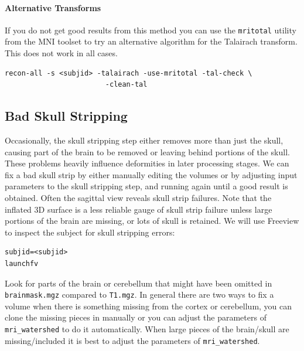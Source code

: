 \documentclass[paper=a4, fontsize=11pt]{scrartcl} %
\numberwithin{equation}{section} %
\numberwithin{figure}{section} %
\numberwithin{table}{section} %
\begin{document}
\paragraph{Alternative Transforms} If you do not get good results from this method you can use the \texttt{mritotal} utility from the MNI toolset to try an alternative algorithm for the Talairach transform.  This does not work in all cases.
~\\
\begin{lstlisting}[frame= single]
recon-all -s <subjid> -talairach -use-mritotal -tal-check \
						-clean-tal
\end{lstlisting}

\subsection{Bad Skull Stripping}\label{ss:ss} Occasionally, the skull stripping step either removes more than just the skull, causing part of the brain to be removed or leaving behind portions of the skull. These problems heavily influence deformities in later processing stages.  We can fix a bad skull strip by either  manually editing the volumes or by adjusting input parameters to the skull stripping step, and running again until a good result is obtained. Often the sagittal view reveals skull strip failures. Note that the inflated 3D surface is a less reliable gauge of skull strip failure unless large portions of the brain are missing, or lots of skull is retained. We will use Freeview to inspect the subject for skull stripping errors:
~\\
\begin{lstlisting}[frame=single]
subjid=<subjid>
launchfv 
\end{lstlisting}
Look for parts of the brain or cerebellum that might have been omitted in \texttt{brainmask.mgz} compared to \texttt{T1.mgz}.  In general there are two ways to fix a volume when there is something missing from the cortex or cerebellum, you can clone the missing pieces in manually or you can adjust the parameters of \texttt{mri\_watershed} to do it automatically.  When large pieces of the brain/skull are missing/included it is best to adjust the parameters of \texttt{mri\_watershed}.
\end{document}
